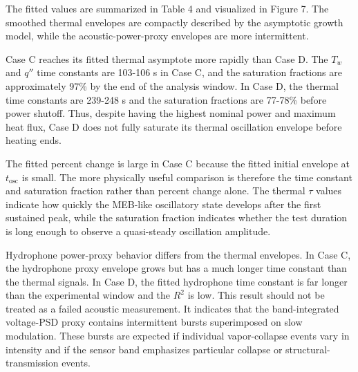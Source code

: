 \documentclass[final,1p,times]{elsarticle}
\begin{document}
The fitted values are summarized in Table 4 and visualized in Figure 7. The smoothed thermal envelopes are compactly described by the asymptotic growth model, while the acoustic-power-proxy envelopes are more intermittent.

\begin{table}[t]
  \centering
  \caption{Asymptotic envelope metrics for the developed high-power cases.}
\end{table}

Case C reaches its fitted thermal asymptote more rapidly than Case D. The $T_w$ and $q''$ time constants are 103-106 s in Case C, and the saturation fractions are approximately 97\% by the end of the analysis window. In Case D, the thermal time constants are 239-248 s and the saturation fractions are 77-78\% before power shutoff. Thus, despite having the highest nominal power and maximum heat flux, Case D does not fully saturate its thermal oscillation envelope before heating ends.

The fitted percent change is large in Case C because the fitted initial envelope at $t_{\mathrm{osc}}$ is small. The more physically useful comparison is therefore the time constant and saturation fraction rather than percent change alone. The thermal $\tau$ values indicate how quickly the MEB-like oscillatory state develops after the first sustained peak, while the saturation fraction indicates whether the test duration is long enough to observe a quasi-steady oscillation amplitude.

Hydrophone power-proxy behavior differs from the thermal envelopes. In Case C, the hydrophone proxy envelope grows but has a much longer time constant than the thermal signals. In Case D, the fitted hydrophone time constant is far longer than the experimental window and the $R^2$ is low. This result should not be treated as a failed acoustic measurement. It indicates that the band-integrated voltage-PSD proxy contains intermittent bursts superimposed on slow modulation. These bursts are expected if individual vapor-collapse events vary in intensity and if the sensor band emphasizes particular collapse or structural-transmission events.
\end{document}

